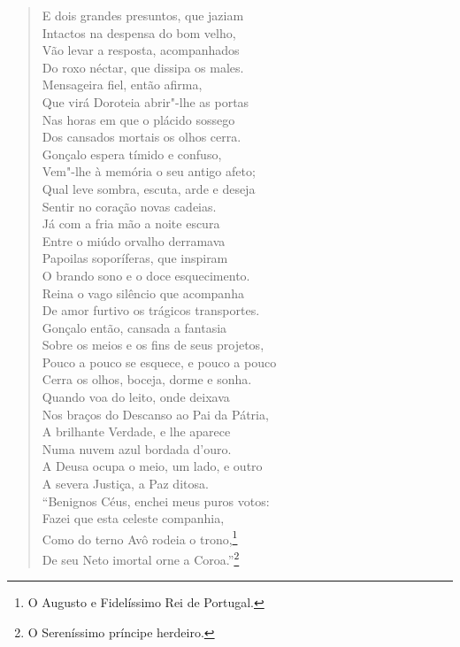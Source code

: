 \begin{verse}
E dois grandes presuntos, que jaziam\\
Intactos na despensa do bom velho,\\
Vão levar a resposta, acompanhados\\
Do roxo néctar, que dissipa os males.\\
Mensageira fiel, então afirma,\\
Que virá Doroteia abrir"-lhe as portas\\
Nas horas em que o plácido sossego\\
Dos cansados mortais os olhos cerra.\\
Gonçalo espera tímido e confuso,\\
Vem"-lhe à memória o seu antigo afeto;\\
Qual leve sombra, escuta, arde e deseja\\
Sentir no coração novas cadeias. \\[10pt]


Já com a fria mão a noite escura\\
Entre o miúdo orvalho derramava\\
Papoilas soporíferas, que inspiram\\
O brando sono e o doce esquecimento.\\
Reina o vago silêncio que acompanha\\
De amor furtivo os trágicos transportes.\\
Gonçalo então, cansada a fantasia\\
Sobre os meios e os fins de seus projetos,\\ %
Pouco a pouco se esquece, e pouco a pouco\\
Cerra os olhos, boceja, dorme e sonha.\\
Quando voa do leito, onde deixava\\
Nos braços do Descanso ao Pai da Pátria,\\ \index{\Paida} %
A brilhante Verdade, e lhe aparece\\		%
Numa nuvem azul bordada d'ouro.\\
A Deusa ocupa o meio, um lado, e outro\\
A severa Justiça, a Paz ditosa. \\[10pt]


``Benignos Céus, enchei meus puros votos:\\
Fazei que esta celeste companhia,\\
Como do terno Avô rodeia o trono,\footnote{ O Augusto e Fidelíssimo Rei de Portugal.}\\		\index{\Aug}
De seu Neto imortal orne a Coroa.''\footnote{ O Sereníssimo príncipe
herdeiro.}\\[10pt] 		\index{\Netoi}



\end{verse}

